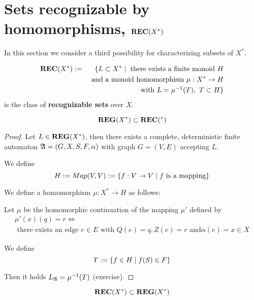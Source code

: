 \section{Sets recognizable by homomorphisms,
\texorpdfstring{$\mbox{{\bf REC}}(X^*)$}{REC(X*)}}

In this section we consider a third possibility for characterizing subsets of
$X^*$.

\begin{definition}
\begin{eqnarray*}
 \mbox{{\bf REC}}(X^*) & := & \{ L \subset X^* \mid \text{ there exists a
finite monoid } H \\
& & \text{ and a monoid homomorphism }\mu : X^* \to H \\
& & \text{ with } L = \mbox{${\mu}^{-1}$}(T),\ T \subset H \}
\end{eqnarray*}
is the class of {\bf recognizable sets} over $X$.
\end{definition}

\bigskip
\begin{lemma}
\[ \mbox{{\bf REG}}(X^*) \subset \mbox{{\bf REC}}(^*) \]
\end{lemma}

\begin{proof}
Let $L \in \mbox{{\bf REG}}(X^*)$, then there exists a complete, deterministic finite
automaton $\mbox{$\mathfrak{A}$} = (G, X, S, F, \alpha)$ with graph $G = (V, E)$ accepting $L$.

We define 
\[ H := Map(V, V) := \mbox{$\{f : V \to V \mid f \text{ is a mapping}\}$} \]

We define a homomorphism $\mu : X^* \to H$ as follows:

Let $\mu$ be the homomorphic continuation of the mapping $\mu'$ defined by
\begin{eqnarray*}
& \mu'(x)(q) = r \iff & \\
& \text{ there exists an edge }e \in E\text{ with }Q(e) = q, Z(e) = r\text{ and
}\alpha(e) = x \in X
\end{eqnarray*}

We define 
\[ T := \mbox{$\{f \in H \mid f(S) \in F\}$} \] 

Then it holds $\mbox{$L_{\mathfrak{A}}$} = \mbox{${\mu}^{-1}$}(T)$ (exercise).
\end{proof}

\bigskip
\begin{lemma}
\[ \mbox{{\bf REC}}(X^*) \subset \mbox{{\bf REG}}(X^*) \]
\end{lemma}

